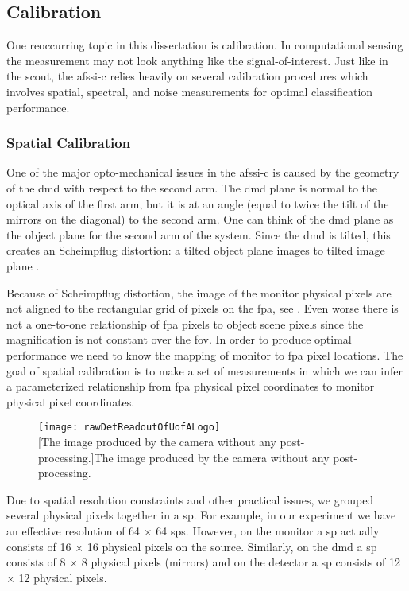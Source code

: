 \subsection{Calibration}

One reoccurring topic in this dissertation is calibration. In computational sensing the measurement may not look anything like the signal-of-interest. Just like in the \acrfull{scout}, the \gls{afssi-c} relies heavily on several calibration procedures which involves spatial, spectral, and noise measurements for optimal classification performance.


\subsubsection{Spatial Calibration}

One of the major opto-mechanical issues in the \gls{afssi-c} is caused by the geometry of the \gls{dmd} with respect to the second arm. The \gls{dmd} plane is normal to the optical axis of the first arm, but it is at an angle (equal to twice the tilt of the mirrors on the diagonal) to the second arm. One can think of the \gls{dmd} plane as the object plane for the second arm of the system. Since the \gls{dmd} is tilted, this creates an Scheimpflug distortion: a tilted object plane images to tilted image plane \cite{smith1966modern}. 

Because of Scheimpflug distortion, the image of the monitor physical pixels are not aligned to the rectangular grid of pixels on the \gls{fpa}, see . Even worse there is not a one-to-one relationship of \gls{fpa} pixels to object scene pixels since the magnification is not constant over the \gls{fov}.  In order to produce optimal performance we need to know the mapping of monitor to \gls{fpa} pixel locations. The goal of spatial calibration is to make a set of measurements in which we can infer a parameterized relationship from \gls{fpa} physical pixel coordinates to monitor physical pixel coordinates. 


\begin{figure}[htb]
	\centering
	\texttt{[image: rawDetReadoutOfUofALogo]}\\
	[The image produced by the camera without any post-processing.]{The image produced by the camera without any post-processing.}
	\label{fig:rawDetReadoutOfUofALogo}
\end{figure}


Due to spatial resolution constraints and other practical issues, we grouped several physical pixels together in a \acrfull{sp}. For example, in our experiment we have an effective resolution of 64 $\times$ 64 \gls{sp}s. However, on the monitor a \gls{sp} actually consists of 16 $\times$ 16 physical pixels on the source. Similarly, on the \gls{dmd} a \gls{sp} consists of 8 $\times$ 8 physical pixels (mirrors) and on the detector a \gls{sp} consists of 12 $\times$ 12 physical pixels.


